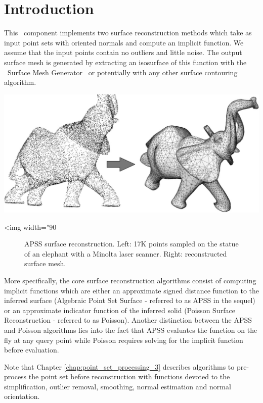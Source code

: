 \section{Introduction}

This \cgal\ component implements two surface reconstruction methods which take as input point sets with oriented normals and compute an implicit function. We assume that the input points contain no outliers and little noise. The output surface mesh is generated by extracting an isosurface of this function with the \cgal\ Surface Mesh Generator~\cite{cgal:ry-gsddrm-06} or potentially with any other surface contouring algorithm. 

\begin{center}
    \label{Surface_reconstruction_points_3-fig-introduction}
    \begin{ccTexOnly}
        \includegraphics[width=1.0\textwidth]{Surface_reconstruction_points_3/introduction} %
    \end{ccTexOnly}
    \begin{ccHtmlOnly}
        <img width="90%
    \end{ccHtmlOnly}
    \begin{figure}[h]
        \caption{APSS surface reconstruction.
                 Left: 17K points sampled on the statue of an
                 elephant with a Minolta laser scanner.
                 Right: reconstructed surface mesh.}
    \end{figure}
\end{center}

More specifically, the core surface reconstruction algorithms consist of computing implicit functions which are either an approximate signed distance function to the inferred surface (Algebraic Point Set Surface - referred to as APSS in the sequel) or an approximate indicator function of the inferred solid (Poisson Surface Reconstruction - referred to as Poisson). Another distinction between the APSS and Poisson algorithms lies into the fact that APSS evaluates the function on the fly at any query point while Poisson requires solving for the implicit function before evaluation. 

Note that Chapter  \ref{chap:point_set_processing_3} describes algorithms to pre-process the point set before reconstruction with functions devoted to the simplification, outlier removal, smoothing, normal estimation and normal orientation.


